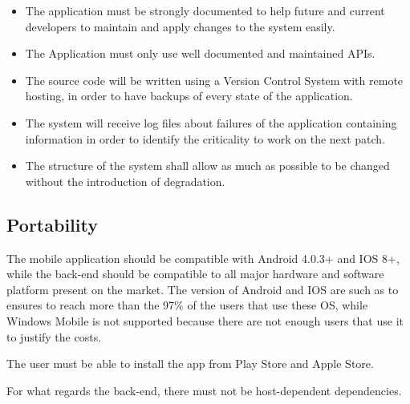 \begin{itemize}
\item The application must be strongly documented to help future and current developers to maintain and apply changes to the system easily.
\item The Application must only use well documented and maintained APIs.
\item The source code will be written using a Version Control System with remote hosting, in order to have backups of every state of the application.
\item The system will receive log files about failures of the application
containing information in order to identify the criticality to work on the next patch.
\item The structure of the system shall allow as much as possible to be changed without the introduction of degradation.
\end{itemize}

\subsection{Portability}
The mobile application should be compatible with Android 4.0.3+ and IOS 8+, while the back-end should be compatible to all major hardware and software platform present on the market.
The version of Android and IOS are such as to ensures to reach more than the 97\% of the users that use these OS, while Windows Mobile is not supported because there are not enough users that use it to justify the costs.

The user must be able to install the app from Play Store and Apple Store.

For what regards the back-end, there must not be host-dependent dependencies.
